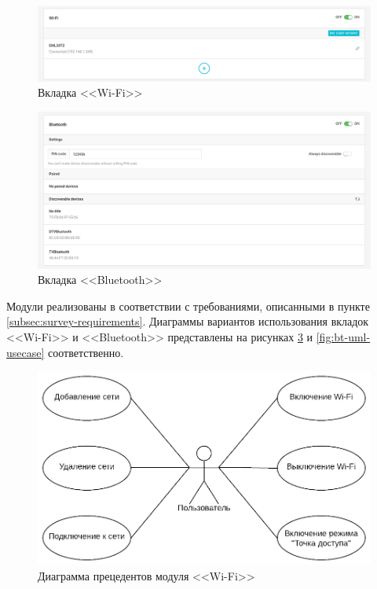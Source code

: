 \begin{figure}[h!]
  \centering
  \setlength{\fboxsep}{5pt}
  \includegraphics[width=.8\textwidth]{img/reachview/wifi_content_laptop}
  \vspace*{6pt}
  \caption{Вкладка <<Wi-Fi>>}
  \label{fig:wi-fi}
\end{figure}

\begin{figure}[h!]
  \centering
  \setlength{\fboxsep}{5pt}
  \includegraphics[width=.8\textwidth]{img/reachview/bt_content_laptop}
  \vspace*{6pt}
  \caption{Вкладка <<Bluetooth>>}
  \label{fig:bluetooth}
\end{figure}

Модули реализованы в соответствии с требованиями, описанными в пункте \ref{subsec:survey-requirements}. Диаграммы вариантов использования вкладок <<Wi-Fi>> и <<Bluetooth>> представлены на рисунках \ref{fig:wifi-uml-usecase} и \ref{fig:bt-uml-usecase} соответственно.

\begin{figure}[h!]
  \centering
  \setlength{\fboxsep}{5pt}
  \includegraphics[width=.75\textwidth]{img/uml/wifi_usecase}
  \vspace*{6pt}
  \caption{Диаграмма прецедентов модуля <<Wi-Fi>>}
  \label{fig:wifi-uml-usecase}
\end{figure}

